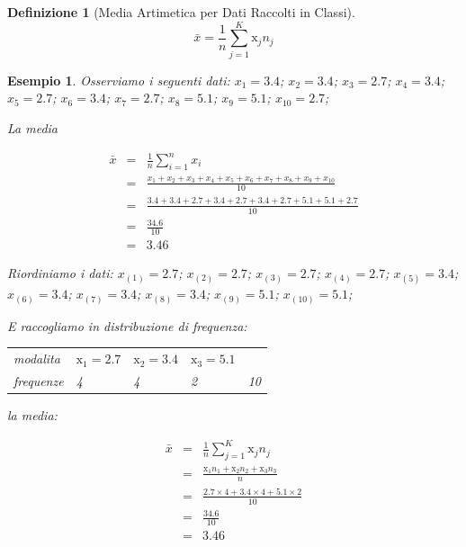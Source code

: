 \documentclass[
  11pt,
]{book}
\theoremstyle{mytheoremstyle}
\theoremstyle{mydefstyle}
\newtheorem{definition}{Definizione}[section]
\newtheorem{example}{{Esempio}}[section]
\begin{document}
\begin{info}

\begin{definition}[Media Artimetica per Dati Raccolti in Classi]
\[
\bar x =\frac 1 n \sum_{j=1}^K\mathrm{x}_j n_j 
\]
\end{definition}

\end{info}

\begin{example}
Osserviamo i seguenti dati:
\(x_{1}=3.4\); \(x_{2}=3.4\); \(x_{3}=2.7\); \(x_{4}=3.4\); \(x_{5}=2.7\); \(x_{6}=3.4\); \(x_{7}=2.7\); \(x_{8}=5.1\); \(x_{9}=5.1\); \(x_{10}=2.7\);

La media

\begin{eqnarray*}
\bar x &=&\frac 1 n \sum_{i=1}^nx_i \\
   &=& \frac{x_{1}+x_{2}+x_{3}+x_{4}+x_{5}+x_{6}+x_{7}+x_{8}+x_{9}+x_{10}} {10} \\
         &=& \frac{3.4+3.4+2.7+3.4+2.7+3.4+2.7+5.1+5.1+2.7}  {10} \\
         &=& \frac{34.6}  {10}\\
         &=& 3.46
\end{eqnarray*}

Riordiniamo i dati:
\(x_{(1)}=2.7\); \(x_{(2)}=2.7\); \(x_{(3)}=2.7\); \(x_{(4)}=2.7\); \(x_{(5)}=3.4\); \(x_{(6)}=3.4\); \(x_{(7)}=3.4\); \(x_{(8)}=3.4\); \(x_{(9)}=5.1\); \(x_{(10)}=5.1\);

E raccogliamo in distribuzione di frequenza:

\begin{tabular}{llll|>{}l}
\toprule
modalita & $\mathrm{x}_1=2.7$ & $\mathrm{x}_2=3.4$ & $\mathrm{x}_3=5.1$ & \\
frequenze & 4 & 4 & 2 & 10\\
\bottomrule
\end{tabular}

la media:

\begin{eqnarray*}
  \bar x &=&\frac 1 n \sum_{j=1}^K\mathrm{x}_j n_j \\
  &=& \frac{\mathrm{x}_1 n_1+\mathrm{x}_2 n_2+\mathrm{x}_3 n_3} n \\
         &=& \frac{2.7\times 4+3.4\times 4+5.1\times 2} {10} \\
         &=& \frac{34.6} {10} \\
         &=& 3.46
\end{eqnarray*}
\end{example}
\end{document}
